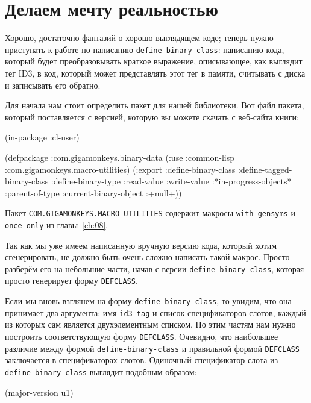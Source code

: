 \section{Делаем мечту реальностью}

Хорошо, достаточно фантазий о хорошо выглядящем коде; теперь нужно приступать к работе по
написанию \lstinline{define-binary-class}: написанию кода, который будет преобразовывать
краткое выражение, описывающее, как выглядит тег ID3, в код, который может представлять
этот тег в памяти, считывать с диска и записывать его обратно.

Для начала нам стоит определить пакет для нашей библиотеки. Вот файл пакета, который
поставляется с версией, которую вы можете скачать с веб-сайта книги:%

\begin{myverb}
(in-package :cl-user)

(defpackage :com.gigamonkeys.binary-data
  (:use :common-lisp :com.gigamonkeys.macro-utilities)
  (:export :define-binary-class
           :define-tagged-binary-class
           :define-binary-type
           :read-value
           :write-value
           :*in-progress-objects*
           :parent-of-type
           :current-binary-object
           :+null+))
\end{myverb}

Пакет \lstinline{COM.GIGAMONKEYS.MACRO-UTILITIES} содержит макросы \lstinline{with-gensyms} и
\lstinline{once-only} из главы~\ref{ch:08}.

Так как мы уже имеем написанную вручную версию кода, который хотим сгенерировать, не
должно быть очень сложно написать такой макрос. Просто разберём его на небольшие части,
начав с версии \lstinline{define-binary-class}, которая просто генерирует форму
\lstinline{DEFCLASS}.

Если мы вновь взглянем на форму \lstinline{define-binary-class}, то увидим, что она принимает
два аргумента: имя \lstinline{id3-tag} и список спецификаторов слотов, каждый из которых сам
является двухэлементным списком. По этим частям нам нужно построить соответствующую форму
\lstinline{DEFCLASS}. Очевидно, что наибольшее различие между формой
\lstinline{define-binary-class} и правильной формой \lstinline{DEFCLASS} заключается в
спецификаторах слотов. Одиночный спецификатор слота из \lstinline{define-binary-class} выглядит
подобным образом:

\begin{myverb}
(major-version u1)
\end{myverb}

